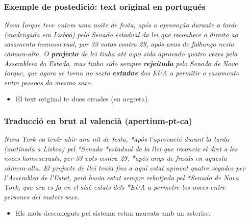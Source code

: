 \documentclass{beamer}
\newcommand{\empha}[1]{\emph{#1}\/}
\begin{document}

\begin{frame}
  \frametitle{Exemple de postedició: text original en portugués} 

  \empha{Nova Iorque teve ontem uma noite de festa, após a aprovação
    durante a tarde (madrugada em Lisboa) pelo Senado estadual da lei
    que reconhece o direito ao casamento homossexual, por 33 votos
    contra 29, após anos de falhanço nesta câmara-alta.  O \textbf{projecto} de
    lei tinha até aqui sido aprovado quatro vezes pela Assembleia do
    Estado, mas tinha sido sempre \textbf{rejeitada} pelo Senado de Nova
    Iorque, que agora se torna no sexto \textbf{estados} dos EUA a permitir o
    casamento entre pessoas do mesmo sexo.}

  \begin{itemize}
  \item El text original te dues errades (en negreta).
  \end{itemize}

\end{frame}

\begin{frame}
  \frametitle{Traducció en brut al valencià (apertium-pt-ca)}

  \empha{Nova York va tenir ahir una nit de festa, *após l'aprovació
    durant la tarda (matinada a Lisboa) pel *Senado *estadual de la
    llei que reconeix el dret a les noces homosexuals, per 33 vots
    contra 29, *após anys de fracàs en aquesta càmera-alta.  El
    projecte de llei tenia fins a aquí estat aprovat quatre vegades
    per l'Assemblea de l'Estat, però havia estat sempre rebutjada pel
    *Senado de Nova York, que ara es fa en el sisè estats dels *EUA a
    permetre les noces entre persones del mateix sexe.}

  \begin{itemize}
  \item Els mots desconeguts pel sistema estan marcats amb un asterisc.
  \end{itemize}
\end{frame}
\end{document}
